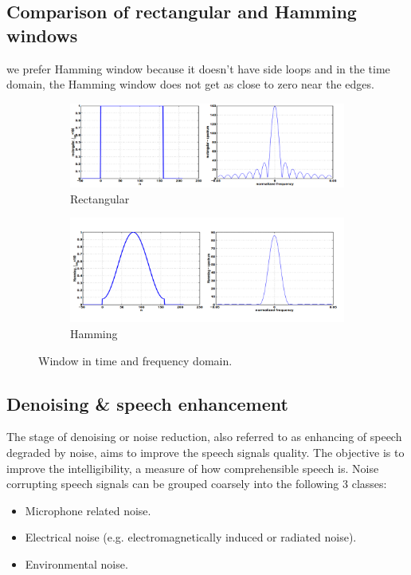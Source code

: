 \documentclass[12pt, a4paper, twoside]{report}
\begin{document}
\subsection{Comparison of rectangular and Hamming windows}
we prefer Hamming window because it doesn't have side loops and in the time domain, the Hamming window does not get as close to zero near the edges.

\begin{figure}[ht]
    \centering
    \begin{subfigure}[b]{1\textwidth}
        \includegraphics[width=\textwidth]
        {images/chapter2/rect-freq-time}
        \caption{Rectangular}
        \label{fig:rect-freq-time}
    \end{subfigure}

    \begin{subfigure}[b]{1\textwidth}
        \includegraphics[width=\textwidth]
        {images/chapter2/hamm-freq-time}
        \caption{Hamming}
        \label{fig:hamm-freq-time}
    \end{subfigure}
    \caption{Window in time and frequency domain.}
    \label{fig:window-freq-time}
\end{figure}

\subsection{Denoising \& speech enhancement}
The stage of denoising or noise reduction, also referred to as enhancing of speech degraded by noise, aims to improve the speech signals quality. The objective is to improve the intelligibility, a measure of how comprehensible speech is. Noise corrupting speech signals can be grouped coarsely into the following 3 classes:
\begin{itemize}
\item Microphone related noise.
\item Electrical noise (e.g. electromagnetically induced or radiated noise).
\item Environmental noise.
\end{itemize}
\end{document}
